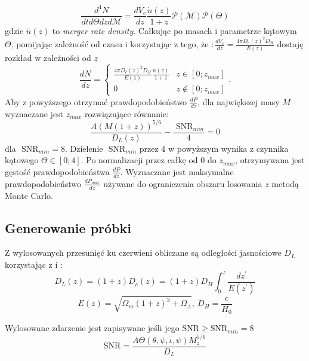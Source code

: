 \documentclass{article}
\begin{document}
\begin{equation}
\frac{d^4N}{dt d\Theta dz d \mathcal{M}}=\frac{dV_c}{dz}\frac{\dot{n}(z)}{1+z} \mathcal{P}(\mathcal{M})\mathcal{P}(\Theta)  
\end{equation}
gdzie $\dot{n}(z)$ to \textit{merger rate density}. Całkując po masach i parametrze kątowym $\Theta$, pomijając zależność od czasu i korzystając z tego, że $:\frac{dV_c}{dz}= \frac{4\pi D_c(z)^2 D_H}{E(z)}$ \cite[,Wzór 21]{hubble} dostaję rozkład w zależności od $z$
\begin{equation}
\frac{dN}{dz}=\begin{cases}\frac{4\pi D_c(z)^2 D_H}{E(z)}\frac{\dot{n}(z)}{1+z}  & z\in[0;z_{max}]\\
0 & z\notin[0;z_{max}]
\end{cases}.
\end{equation}
Aby z powyższego otrzymać prawdopodobieństwo $\frac{dP}{dz}$, dla największej masy $M$ wyznaczane jest $z_{max}$ rozwiązujące równanie:
\begin{equation}
\frac{A (M(1+z))^{5/6}}{D_L(z)}-\frac{\mbox{ SNR}_{min}}{4}=0
\end{equation}
dla $\mbox{ SNR}_{min} = 8$. Dzielenie $\mbox{ SNR}_{min}$ przez 4 w powyższym wynika z czynnika kątowego $\Theta \in[0;4] $. Po normalizacji przez całkę od $0$ do $z_{max}$, otrzymywana jest gęstość prawdopodobieństwa $\frac{dP}{dz}$. Wyznaczane jest maksymalne prawdopodobieństwo $ \frac{dP_{max}}{dz}$ używane do ograniczenia obszaru losowania $z$ metodą Monte Carlo.
\subsection{Generowanie próbki}
Z wylosowanych przesunięć ku czerwieni obliczane są odległości jasnościowe $D_L$ korzystając z \cite[,Wzór 19]{hubble} i \cite[,Wzór 20]{hubble}:
\begin{equation}
D_L(z)=(1+z) D_c(z)=(1+z)D_H \int_{0}^{z}\dfrac{dz^\prime}{E(z^\prime)}
\end{equation}
\begin{equation}
E(z)=\sqrt{\Omega_m(1+z)^3+\Omega_\Lambda},\ D_H=\frac{c}{H_0}
\end{equation}

Wylosowane zdarzenie jest zapisywane jeśli jego $\mbox{SNR} \geq \mbox{SNR}_{min}=8$
\begin{equation}
\mbox{SNR}=\frac{A\Theta(\theta, \psi, \iota, \psi) M_z^{5/6}}{D_L}
\end{equation}
\end{document}
